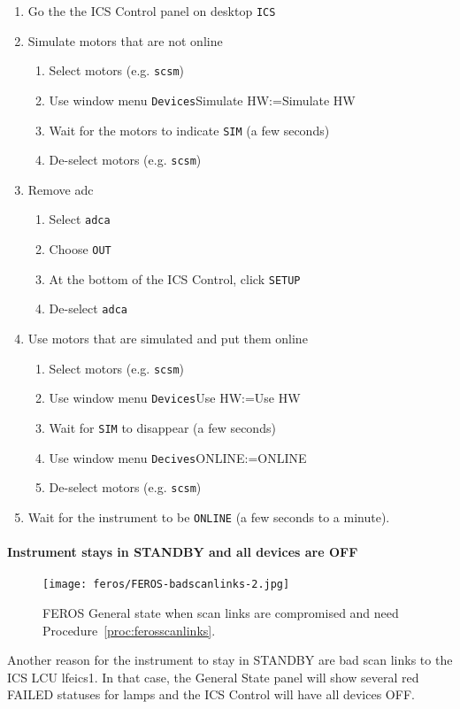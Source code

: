 \documentclass[11pt,fleqn,a4paper]{book}
\makeatletter
\def\menu#1#2{\texttt{#1}\ifx{}#2\else\@for\@x:=#2\do{$\rightarrow$\texttt{\@x}}\fi}
\def\wmenu#1#2{window menu \menu{#1}{#2}}
\makeatother
\begin{document}
\label{proc:ferosadcatstartup}
\begin{enumerate}
    \item Go the the \gls{ICS Control} panel on \gls{desktop} \texttt{ICS}
    \item Simulate motors that are not online
    \begin{enumerate}
         \item Select motors (e.g. \texttt{scsm})
         \item Use \wmenu{Devices}{Simulate HW}
         \item Wait for the motors to indicate \texttt{SIM} (a few seconds)
         \item De-select motors (e.g. \texttt{scsm})
    \end{enumerate}
    \item Remove \gls{adc}
    \begin{enumerate}
        \item Select \texttt{adca}
        \item Choose \texttt{OUT}
        \item At the bottom of the ICS Control, click \texttt{SETUP}
        \item De-select \texttt{adca}
    \end{enumerate}
    \item Use motors that are simulated and put them online
    \begin{enumerate}
         \item Select motors (e.g. \texttt{scsm})
         \item Use \wmenu{Devices}{Use HW}
         \item Wait for \texttt{SIM} to disappear (a few seconds)
         \item Use \wmenu{Decives}{ONLINE}
         \item De-select motors (e.g. \texttt{scsm})
    \end{enumerate}
    \item Wait for the instrument to be \texttt{ONLINE} (a few seconds to a minute).
\end{enumerate}

\paragraph{Instrument stays in STANDBY and all devices are OFF}
\begin{figure}
\centering
\texttt{[image: feros/FEROS-badscanlinks-2.jpg]}
\caption[When feinsInstallScanLinks is needed]{FEROS General state when scan links are compromised and need Procedure~\ref{proc:ferosscanlinks}.}
\end{figure}
Another reason for the instrument to stay in STANDBY are bad scan links to the ICS LCU \gls{lfeics1}. In that case, the \gls{General State} panel will show several red FAILED statuses for lamps and the \gls{ICS Control} will have all devices OFF.
\end{document}
